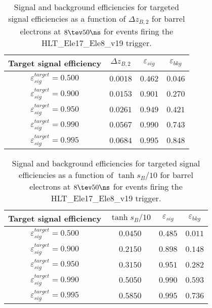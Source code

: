 \clearpage

\begin{table}[!bht]
  \begin{center}
    \begin{tabular}{cccc}
      \hline
      Target signal efficiency & $\Delta z_{B,2}$ & $\varepsilon_{sig}$ & $\varepsilon_{bkg}$ \\ 
      \hline
      $\varepsilon_{sig}^{target} = 0.500$ & $  0.0018$ & $0.462$ & $0.046$ \\
      $\varepsilon_{sig}^{target} = 0.900$ & $  0.0153$ & $0.901$ & $0.270$ \\
      $\varepsilon_{sig}^{target} = 0.950$ & $  0.0261$ & $0.949$ & $0.421$ \\
      $\varepsilon_{sig}^{target} = 0.990$ & $  0.0567$ & $0.990$ & $0.743$ \\
      $\varepsilon_{sig}^{target} = 0.995$ & $  0.0684$ & $0.995$ & $0.848$ \\
      \hline
    \end{tabular}
    \caption{Signal and background efficiencies for targeted signal efficiencies as a function of $\Delta z_{B,2}$ for barrel electrons at $8\tev 50\ns$ for events firing the HLT\_Ele17\_Ele8\_v19 trigger.}
    \label{tab:eff_rej_z2B_beam_8_50_trigger_17_8_B}
  \end{center}
\end{table}

\clearpage

\begin{table}[!bht]
  \begin{center}
    \begin{tabular}{cccc}
      \hline
      Target signal efficiency & $\tanh{s_B/10}$ & $\varepsilon_{sig}$ & $\varepsilon_{bkg}$ \\ 
      \hline
      $\varepsilon_{sig}^{target} = 0.500$ & $  0.0450$ & $0.485$ & $0.011$ \\
      $\varepsilon_{sig}^{target} = 0.900$ & $  0.2150$ & $0.898$ & $0.148$ \\
      $\varepsilon_{sig}^{target} = 0.950$ & $  0.3150$ & $0.951$ & $0.282$ \\
      $\varepsilon_{sig}^{target} = 0.990$ & $  0.5050$ & $0.990$ & $0.593$ \\
      $\varepsilon_{sig}^{target} = 0.995$ & $  0.5850$ & $0.995$ & $0.736$ \\
      \hline
    \end{tabular}
    \caption{Signal and background efficiencies for targeted signal efficiencies as a function of $\tanh{s_B/10}$ for barrel electrons at $8\tev 50\ns$ for events firing the HLT\_Ele17\_Ele8\_v19 trigger.}
    \label{tab:eff_rej_sB_beam_8_50_trigger_17_8_B}
  \end{center}
\end{table}

